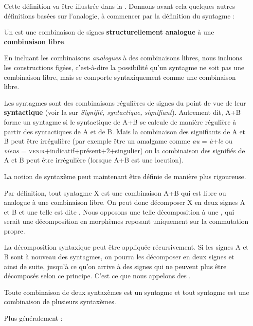 Cette définition va être illustrée dans la . Donnons avant cela quelques autres définitions basées sur l’analogie, à commencer par la définition du syntagme :

\begin{styleLivreImportant}
Un  est une combinaison de signes \textbf{structurellement analogue} à une \textbf{combinaison libre}.
\end{styleLivreImportant}

En incluant les combinaisons \textit{analogues} à des combinaisons libres, nous incluons les constructions figées, c’est-à-dire la possibilité qu’un syntagme ne soit pas une combinaison libre, mais se comporte syntaxiquement comme une combinaison libre.

Les syntagmes sont des combinaisons régulières de signes du point de vue de leur \textbf{syntactique} (voir la  sur \textit{Signifié, syntactique, signifiant}). Autrement dit, A+B forme un syntagme si le syntactique de A+B se calcule de manière régulière à partir des syntactiques de A et de B. Mais la combinaison des signifiants de A et B peut être irrégulière (par exemple être un amalgame comme \textit{au} = \textit{à}+\textit{le} ou \textit{viens} = \textsc{venir}+indicatif+présent+2+singulier) ou la combinaison des signifiés de A et B peut être irrégulière (lorsque A+B est une locution).

La notion de syntaxème peut maintenant être définie de manière plus rigoureuse.

Par définition, tout syntagme X est une combinaison A+B qui est libre ou analogue à une combinaison libre. On peut donc décomposer X en deux signes A et B et une telle  est dite . Nous opposons une telle décomposition à une , qui serait une décomposition en morphèmes reposant uniquement sur la commutation propre.

La décomposition syntaxique peut être appliquée récursivement. Si les signes A et B sont à nouveau des syntagmes, on pourra les décomposer en deux signes et ainsi de suite, jusqu’à ce qu’on arrive à des signes qui ne peuvent plus être décomposés selon ce principe. C’est ce que nous appelons des .

Toute combinaison de deux syntaxèmes est un syntagme et tout syntagme est une combinaison de plusieurs syntaxèmes.

Plus généralement :

